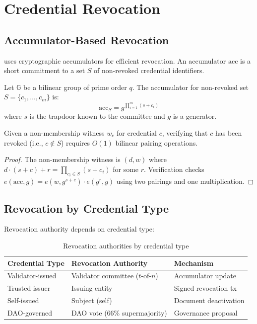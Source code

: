 \section{Credential Revocation}


\subsection{Accumulator-Based Revocation}

\IChain{} uses cryptographic accumulators \cite{camenisch2009accumulator} for efficient revocation. An accumulator $\text{acc}$ is a short commitment to a set $S$ of non-revoked credential identifiers.

\begin{definition}
Let $\mathbb{G}$ be a bilinear group of prime order $q$. The accumulator for non-revoked set $S = \{c_1, \ldots, c_m\}$ is:
\[
\text{acc}_S = g^{\prod_{i=1}^{m}(s + c_i)}
\]
where $s$ is the trapdoor known to the committee and $g$ is a generator.
\end{definition}

\begin{theorem}
Given a non-membership witness $w_c$ for credential $c$, verifying that $c$ has been revoked (i.e., $c \notin S$) requires $O(1)$ bilinear pairing operations.
\end{theorem}

\begin{proof}
The non-membership witness is $(d, w)$ where $d \cdot (s + c) + r = \prod_{c_i \in S}(s + c_i)$ for some $r$. Verification checks $e(\text{acc}, g) = e(w, g^{s+c}) \cdot e(g^r, g)$ using two pairings and one multiplication.
\end{proof}

\subsection{Revocation by Credential Type}

Revocation authority depends on credential type:

\begin{table}[h]
\centering
\begin{tabular}{lll}
\toprule
\textbf{Credential Type} & \textbf{Revocation Authority} & \textbf{Mechanism} \\
\midrule
Validator-issued & Validator committee ($t$-of-$n$) & Accumulator update \\
Trusted issuer & Issuing entity & Signed revocation tx \\
Self-issued & Subject (self) & Document deactivation \\
DAO-governed & DAO vote (66\% supermajority) & Governance proposal \\
\bottomrule
\end{tabular}
\caption{Revocation authorities by credential type}
\label{tab:revocation}
\end{table}

